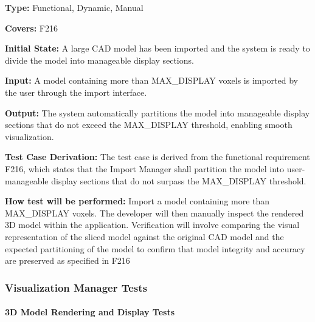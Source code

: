 \documentclass[12pt, titlepage]{article}
\begin{document}
\begin{enumerate}
\textbf{Type:} Functional, Dynamic, Manual

\textbf{Covers:} F216
					
\textbf{Initial State:} A large CAD model has been imported and the system is ready to divide the model into manageable display sections.
					
\textbf{Input:} A model containing more than MAX\_DISPLAY voxels is imported by the user through the import interface.
					
\textbf{Output:} The system automatically partitions the model into manageable display sections that do not exceed the MAX\_DISPLAY threshold, enabling smooth visualization.

\textbf{Test Case Derivation:} The test case is derived from the functional requirement F216, which states that the Import Manager shall partition the model into user-manageable display sections that do not surpass the MAX\_DISPLAY threshold.
					
\textbf{How test will be performed:} Import a model containing more than MAX\_DISPLAY voxels. The developer will then manually inspect the rendered 3D model within the application. Verification will involve comparing the visual representation of the sliced model against the original CAD model and the expected partitioning of the model to confirm that model integrity and accuracy are preserved as specified in F216

\end{enumerate}

\subsubsection{Visualization Manager Tests}

\paragraph{3D Model Rendering and Display Tests}
\end{document}
